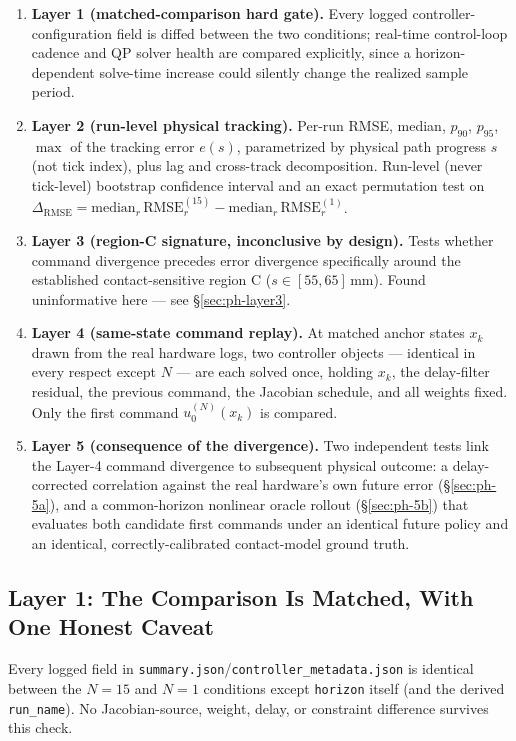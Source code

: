 \documentclass[11pt]{article}
\begin{document}
\begin{enumerate}
\item \textbf{Layer 1 (matched-comparison hard gate).} Every logged
  controller-configuration field is diffed between the two
  conditions; real-time control-loop cadence and QP solver health are
  compared explicitly, since a horizon-dependent solve-time increase
  could silently change the realized sample period.
\item \textbf{Layer 2 (run-level physical tracking).} Per-run RMSE, median,
  $p_{90}$, $p_{95}$, $\max$ of the tracking error $e(s)$, parametrized
  by physical path progress $s$ (not tick index), plus lag and
  cross-track decomposition. Run-level (never tick-level) bootstrap
  confidence interval and an exact permutation test on
  $\Delta_{\mathrm{RMSE}} = \mathrm{median}_r\,\mathrm{RMSE}_r^{(15)} -
  \mathrm{median}_r\,\mathrm{RMSE}_r^{(1)}$.
\item \textbf{Layer 3 (region-C signature, inconclusive by design).} Tests
  whether command divergence precedes error divergence specifically
  around the established contact-sensitive region C
  ($s\in[55,65]\,\mathrm{mm}$). Found uninformative here --- see
  \S\ref{sec:ph-layer3}.
\item \textbf{Layer 4 (same-state command replay).} At matched anchor
  states $x_k$ drawn from the real hardware logs, two controller
  objects --- identical in every respect except $N$ --- are each
  solved once, holding $x_k$, the delay-filter residual, the previous
  command, the Jacobian schedule, and all weights fixed. Only the
  first command $u_0^{(N)}(x_k)$ is compared.
\item \textbf{Layer 5 (consequence of the divergence).} Two independent
  tests link the Layer-4 command divergence to subsequent physical
  outcome: a delay-corrected correlation against the real hardware's
  own future error (\S\ref{sec:ph-5a}), and a common-horizon nonlinear
  oracle rollout (\S\ref{sec:ph-5b}) that evaluates both candidate
  first commands under an identical future policy and an identical,
  correctly-calibrated contact-model ground truth.
\end{enumerate}

\subsection{Layer 1: The Comparison Is Matched, With One Honest Caveat}
\label{sec:ph-layer1}

Every logged field in \texttt{summary.json}/\texttt{controller\_metadata.json}
is identical between the $N{=}15$ and $N{=}1$ conditions except
\texttt{horizon} itself (and the derived \texttt{run\_name}). No
Jacobian-source, weight, delay, or constraint difference survives this
check.
\end{document}
